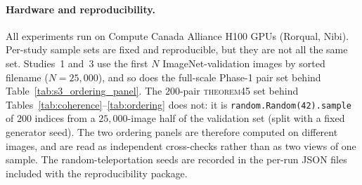 \paragraph{Hardware and reproducibility.}
All experiments run on Compute Canada Alliance H100 GPUs (Rorqual,
Nibi). Per-study sample sets are fixed and reproducible, but they are not all
the same set. Studies~1 and~3 use the first $N$ ImageNet-validation images by
sorted filename ($N=25{,}000$), and so does the full-scale Phase-1 pair set
behind Table~\ref{tab:s3_ordering_panel}. The $200$-pair \textsc{theorem45}
set behind Tables~\ref{tab:coherence}--\ref{tab:ordering} does not: it is
\texttt{random.Random(42).sample} of $200$ indices from a $25{,}000$-image
half of the validation set (split with a fixed generator seed). The two
ordering panels are therefore computed on different images, and are read as
independent cross-checks rather than as two views of one sample. The
random-teleportation seeds are recorded in the
per-run JSON files included with the reproducibility package.
